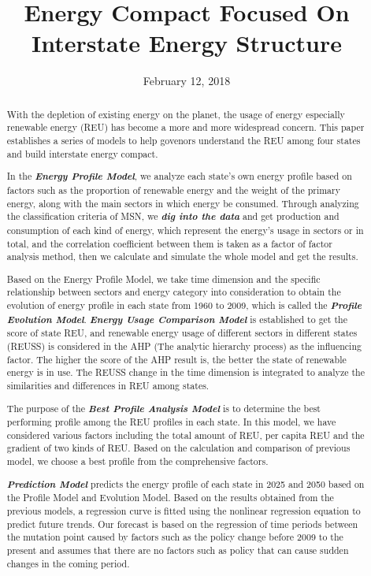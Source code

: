 \documentclass[a4paper,11pt]{article}
\title{Energy Compact Focused On Interstate Energy Structure}%
\date{February 12, 2018}
\begin{document}
\begin{abstract}


\par With the depletion of existing energy on the planet, the usage of energy especially renewable energy (REU) has become a more and more widespread concern. This paper establishes a series of models to help govenors understand the REU among four states and build interstate energy compact.

\par In the \textbf{\emph{Energy Profile Model}}, we analyze each state's own energy profile based on factors such as the proportion of renewable energy and the weight of the primary energy, along with the main sectors in which energy be consumed. Through analyzing the classification criteria of MSN, we \textbf{\emph{dig into the data}} and get production and consumption of each kind of energy, which represent the energy's usage in sectors or in total, and the correlation coefficient between them is taken as a factor of factor analysis method, then we calculate and simulate the whole model and get the results.

\par Based on the Energy Profile Model, we take time dimension and the specific relationship between sectors and energy category into consideration to obtain the evolution of energy profile in each state from 1960 to 2009, which is called the \textbf{\emph{Profile Evolution Model}}. \textbf{\emph{Energy Usage Comparison Model}} is established to get the score of state REU, and renewable energy usage of different sectors in different states (REUSS) is considered in the AHP (The analytic hierarchy process) as the influencing factor. The higher the score of the AHP result is, the better the state of renewable energy is in use. The REUSS change in the time dimension is integrated to analyze the similarities and differences in REU among states.

\par The purpose of the \textbf{\emph{Best Profile Analysis Model}} is to determine the best performing profile among the REU profiles in each state. In this model, we have considered various factors including the total amount of REU, per capita REU and the gradient of two kinds of REU. Based on the calculation and comparison of previous model, we choose a best profile from the comprehensive factors.

\par \textbf{\emph{Prediction Model}} predicts the energy profile of each state in 2025 and 2050 based on the Profile Model and Evolution Model. Based on the results obtained from the previous models, a regression curve is fitted using the nonlinear regression equation to predict future trends. Our forecast is based on the regression of time periods between the mutation point caused by factors such as the policy change before 2009 to the present and assumes that there are no factors such as policy that can cause sudden changes in the coming period.


\end{abstract}
\end{document}

